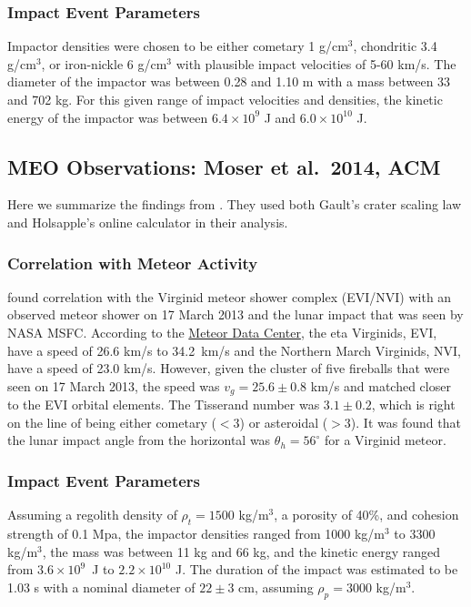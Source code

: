 \documentclass{hitec}
\numberwithin{equation}{section}
\begin{document}
\subsubsection{Impact Event Parameters}
Impactor densities were chosen to be either cometary 1 g/cm$^3$, chondritic 3.4 g/cm$^3$, or iron-nickle 6 g/cm$^3$ with plausible impact velocities of 5-60 km/s. The diameter of the impactor was between 0.28 and 1.10 m with a mass between 33 and 702 kg. For this given range of impact velocities and densities, the kinetic energy of the impactor was between $6.4\times 10^9$ J and $6.0\times 10^{10}$ J.

\subsection{MEO Observations: Moser et al.\ 2014, ACM}
Here we summarize the findings from \cite{moser2014large}. They used both Gault's crater scaling law \citep{gault1974impact} and Holsapple's online calculator \citep{holsapple1993scaling} in their analysis.

\subsubsection{Correlation with Meteor Activity}
\cite{moser2014large} found correlation with the Virginid meteor shower complex (EVI/NVI) with an observed meteor shower on 17 March 2013 and the lunar impact that was seen by NASA MSFC. According to the \href{https://www.ta3.sk/IAUC22DB/MDC2007/Roje/pojedynczy_obiekt.php?kodstrumienia=00011&colecimy=1&kodmin=00001&kodmax=00569&sortowanie=0}{Meteor Data Center}, the eta Virginids, EVI, have a speed of 26.6 km/s to 34.2~km/s and the Northern March Virginids, NVI, have a speed of 23.0 km/s. However, given the cluster of five fireballs that were seen on 17 March 2013, the speed was $v_g = 25.6\pm 0.8$ km/s and matched closer to the EVI orbital elements. The Tisserand number was $3.1 \pm 0.2$, which is right on the line of being either cometary ($<3$) or asteroidal ($>3$). It was found that the lunar impact angle from the horizontal was $\theta_h = 56^\circ$ for a Virginid meteor.


\subsubsection{Impact Event Parameters}
Assuming a regolith density of $\rho_t = 1500$ kg/m$^3$, a porosity of 40\%, and cohesion strength of 0.1 Mpa, the impactor densities ranged from 1000 kg/m$^3$ to 3300 kg/m$^3$, the mass was between 11 kg and 66 kg, and the kinetic energy ranged from $3.6\times 10^9$~J to $2.2\times 10^{10}$ J. The duration of the impact was estimated to be 1.03 s with a nominal diameter of $22\pm 3$ cm, assuming $\rho_p = 3000$ kg/m$^3$.
\end{document}

